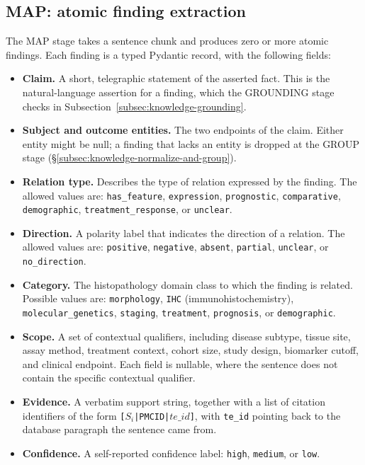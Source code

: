 \subsection{MAP: atomic finding extraction}\label{subsec:knowledge-map}

The MAP stage takes a sentence chunk and produces zero or more atomic findings. Each finding is a typed Pydantic record, with the following fields: 

\begin{itemize}[label={}, leftmargin=1.5em, itemsep=0.4em]

    \item \textbf{Claim.} A short, telegraphic statement of the asserted fact. This is the natural-language assertion for a finding, which the GROUNDING stage checks in Subsection~\ref{subsec:knowledge-grounding}.
    
    \item \textbf{Subject and outcome entities.} The two endpoints of the claim. Either entity might be null; a finding that lacks an entity is dropped at the GROUP stage (§\ref{subsec:knowledge-normalize-and-group}).
    
    \item \textbf{Relation type.} Describes the type of relation expressed by the finding. The allowed values are: \texttt{has\_feature}, \texttt{expression}, \texttt{prognostic}, \texttt{comparative}, \texttt{demographic}, \texttt{treatment\_response}, or \texttt{unclear}.
    
    \item \textbf{Direction.} A polarity label that indicates the direction of a relation. The allowed values are: \texttt{positive}, \texttt{negative}, \texttt{absent}, \texttt{partial}, \texttt{unclear}, or \texttt{no\_direction}.
    
    \item \textbf{Category.} The histopathology domain class to which the finding is related. Possible values are: \texttt{morphology}, \texttt{IHC} (immunohistochemistry), \texttt{molecular\_genetics}, \texttt{staging}, \texttt{treatment}, \texttt{prognosis}, or \texttt{demographic}.
    
    \item \textbf{Scope.} A set of contextual qualifiers, including disease subtype, tissue site, assay method, treatment context, cohort size, study design, biomarker cutoff, and clinical endpoint. Each field is nullable, where the sentence does not contain the specific contextual qualifier. 
    
    \item \textbf{Evidence.} A verbatim support string, together with a list of citation identifiers of the form \texttt{[$S_{i}$|PMCID|$te\_id$]}, with \texttt{te\_id} pointing back to the database paragraph the sentence came from.
    
    \item \textbf{Confidence.} A self-reported confidence label: \texttt{high}, \texttt{medium}, or \texttt{low}. 
    
\end{itemize}

